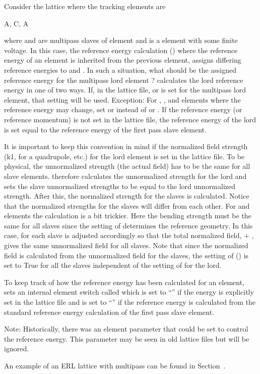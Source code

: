Consider the lattice where the tracking elements are
\begin{example}
  A, C, A
\end{example}
where  and  are multipass slaves of element  and  is a 
element with some finite voltage. In this case, the reference energy calculation ()
where the reference energy of an element is inherited from the previous element, assigns differing
reference energies to  and . In such a situation, what should be the assigned
reference energy for the multipass lord element ? \bmad calculates the lord reference energy
in one of two ways. If, in the lattice file,  or  is set for the multipass lord
element, that setting will be used. Exception: For , , and 
elements where the reference energy may change, set  or  instead of
 or .  If the reference energy (or reference momentum) is not set in the lattice
file, the reference energy of the lord is set equal to the reference energy of the first pass slave
element.

It is important to keep this convention in mind if the normalized field strength (k1, for a
quadrupole, etc.) for the lord element is set in the lattice file. To be physical, the unnormalized
strength (the actual field) has to be the same for all slave elements. \bmad therefore calculates
the unnormalized strength for the lord and sets the slave unnormalized strengths to be equal to the
lord unnormalized strength. After this, the normalized strength for the slaves is calculated. Notice
that the normalized strengths for the slaves will differ from each other. For  and
 elements the calculation is a bit trickier. Here the  bending strength must be the
same for all slaves since the setting of  determines the reference geometry. In this case,
 for each slave is adjusted accordingly so that the total normalized field,  +
, gives the same unnormalized field for all slaves. Note that since the normalized field
is calculated from the unnormalized field for the slaves, the setting of 
() is set to True for all the slaves independent of the setting of
 for the lord.

To keep track of how the reference energy has been calculated for an element, \bmad sets an internal
element switch called  which is set to ``'' if the energy is
explicitly set in the lattice file and is set to ``'' if the reference energy is
calculated from the standard reference energy calculation of the first pass slave element.

Note: Historically, there was an element parameter  that could be set to control the
reference energy. This parameter may be seen in old lattice files but will be ignored.

An example of an ERL lattice with multipass can be found in Section~.
